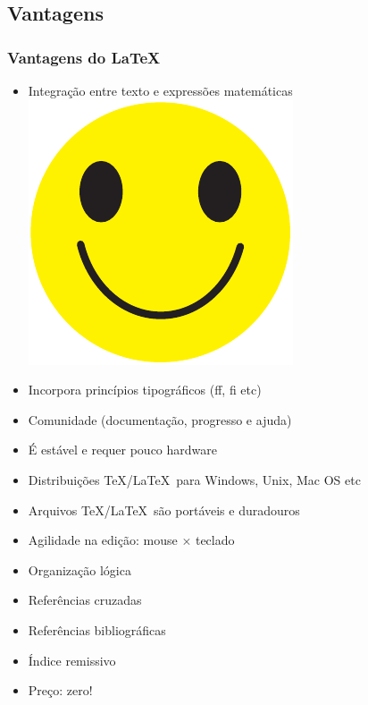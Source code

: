 \documentclass[handout]{beamer}
\begin{document}
\subsection{Vantagens}

\begin{frame}
  \frametitle{Vantagens do \LaTeX}

  \begin{itemize}
  \item<+-> Integração entre texto e expressões matemáticas \quad \hyperlink{word}{\includegraphics[width=2ex]{smiley}}
  \item<+-> Incorpora princípios tipográficos (ff, fi etc)

  \item<+-> Comunidade (documentação, progresso e ajuda)

  \item<+-> É estável e requer pouco hardware
  \item<+-> Distribuições \TeX/\LaTeX\ para Windows, Unix, Mac OS etc
  \item<+-> Arquivos \TeX/\LaTeX\ são portáveis e duradouros  
  
  \item<+-> Agilidade na edição: mouse $\times$ teclado
  \item<+-> \alert<8>{Organização lógica}
  \item<+-> Referências cruzadas
  \item<+-> Referências bibliográficas  
  \item<+-> Índice remissivo  
  \item<+-> Preço: \alert<12>{zero!}
  \end{itemize}  
\end{frame}

\end{document}
